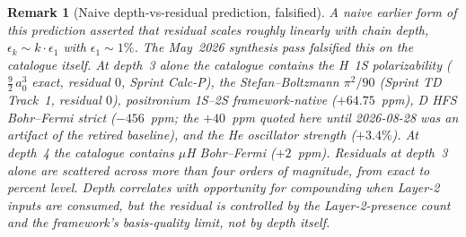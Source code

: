 \documentclass[11pt]{article}
\newtheorem{remark}{Remark}
\begin{document}
\begin{remark}[Naive depth-vs-residual prediction, falsified]
\label{rem:depth_falsification}
A naive earlier form of this prediction asserted that residual
scales roughly linearly with chain depth, $\epsilon_k \sim k \cdot
\epsilon_1$ with $\epsilon_1 \sim 1\%$.  The May~2026 synthesis
pass falsified this on the catalogue itself.  At depth~3 alone the
catalogue contains the H~1S polarizability ($\tfrac{9}{2}\,a_0^3$
exact, residual $0$, Sprint Calc-P), the Stefan--Boltzmann
$\pi^2/90$ (Sprint TD Track~1, residual $0$), positronium 1S--2S
framework-native ($+64.75$~ppm), D HFS Bohr--Fermi strict
($-456$~ppm; the $+40$~ppm quoted here until 2026-08-28 was an artifact
of the retired baseline), and the He oscillator strength ($+3.4\%$).  At depth~4
the catalogue contains $\mu$H Bohr--Fermi ($+2$~ppm).  Residuals at
depth~3 alone are scattered across more than four orders of
magnitude, from exact to percent level.  Depth correlates with \emph{opportunity} for
compounding when Layer-2 inputs are consumed, but the residual is
controlled by the Layer-2-presence count and the framework's
basis-quality limit, not by depth itself.
\end{remark}
\end{document}
